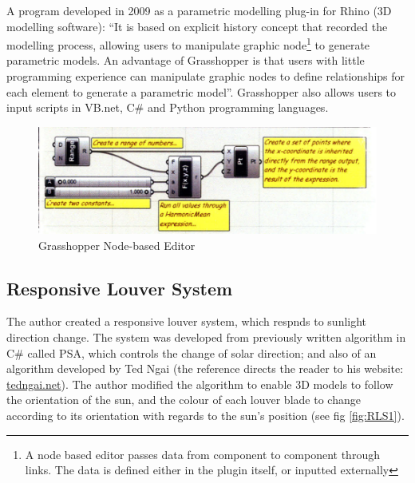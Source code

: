 A program developed in 2009 as a parametric modelling plug-in for Rhino (3D modelling software): ``It is based on explicit history concept that recorded the modelling process, allowing users to manipulate graphic node\footnote{A node based editor passes data from component to component through links. The data is defined either in the plugin itself, or inputted externally} to generate parametric models. An advantage of Grasshopper is that users with little programming experience can manipulate graphic nodes to define relationships for each element to generate a parametric model''\cite{yi09}. Grasshopper also allows users to input scripts in VB.net, C\# and Python programming languages.

\begin{figure}[h]
\centering
\includegraphics[width=\textwidth]{./Images/31-GrassGUI}
\caption[Grasshopper Node-based Editor]{Grasshopper Node-based Editor \cite{yi09}}
\label{fig:GrassGUI}
\end{figure}

\subsection{Responsive Louver System}

The author created a responsive louver system, which respnds to sunlight direction change. The system was developed from previously written algorithm in C\# called PSA, which controls the change of solar direction; and also of an algorithm developed by Ted Ngai (the reference directs the reader to his website: \url{tedngai.net}). The author modified the algorithm to enable 3D models to follow the orientation of the sun, and the colour of each louver blade to change according to its orientation with regards to the sun's position (see fig \ref{fig:RLS1}).

